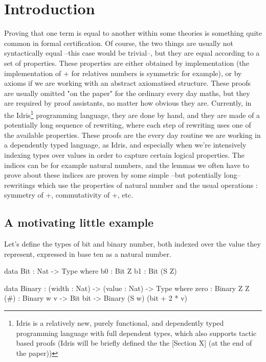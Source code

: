 \section{Introduction}


Proving that one term is equal to another within some theories is something quite common in formal certification. Of course, the two things are usually not syntactically equal --this case would be trivial--, but they are equal according to a set of properties. These properties are either obtained by implementation (the implementation of + for relatives numbers is symmetric for example), or by axioms if we are working with an abstract axiomatised structure. 
These proofs are usually omitted "on the paper" for the ordinary every day maths, but they are required by proof assistants, no matter how obvious they are. Currently, in the Idris\footnote{Idris is a relatively new, purely functional, and dependently typed programming language with full dependent types, which also supports tactic based proofs  (Idris will be briefly defined the the [Section X] (at the end of the paper))} programming language, they are done by hand, and they are made of a potentially long sequence of rewriting, where each step of rewriting uses one of the available properties. 
These proofs are the every day routine we are working in a dependently typed language, as Idris, and especially when we're intensively indexing types over values in order to capture certain logical properties.
The indices can be for example natural numbers, and the lemmas we often have to prove about these indices are proven by some simple --but potentially long-- rewritings which use the properties of natural number and the usual operations : symmetry of +, commutativity of +, etc.

\subsection{A motivating little example}
Let's define the types of bit and binary number, both indexed over the value they represent, expressed in base ten as a natural number.
\begin{code}[caption=Bit and binary number, captionpos=b, label=lst1:haskell2]
data Bit : Nat -> Type where
     b0 : Bit Z
     b1 : Bit (S Z)
     
data Binary : (width : Nat) -> (value : Nat) 
              -> Type where
     zero : Binary Z Z
     (#) : Binary w v -> Bit bit 
           -> Binary (S w) (bit + 2 * v)
\end{code}

